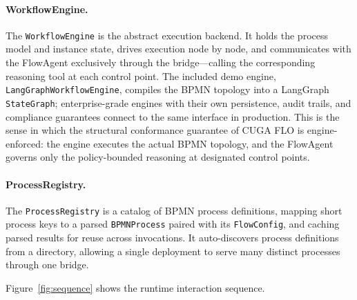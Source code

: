 \documentclass[11pt,a4paper]{article}
\begin{document}
\paragraph{WorkflowEngine.}
The \texttt{WorkflowEngine} is the abstract execution backend. It holds the process
model and instance state, drives execution node by node, and communicates with the
FlowAgent exclusively through the bridge---calling the corresponding reasoning tool
at each control point. The included demo engine, \texttt{LangGraphWorkflowEngine},
compiles the BPMN topology into a LangGraph \texttt{StateGraph}; enterprise-grade
engines with their own persistence, audit trails, and compliance guarantees connect
to the same interface in production. This is the sense in which the structural
conformance guarantee of CUGA FLO is engine-enforced: the engine executes the actual
BPMN topology, and the FlowAgent governs only the policy-bounded reasoning at
designated control points.

\paragraph{ProcessRegistry.}
The \texttt{ProcessRegistry} is a catalog of BPMN process definitions, mapping short
process keys to a parsed \texttt{BPMNProcess} paired with its \texttt{FlowConfig}, and
caching parsed results for reuse across invocations. It auto-discovers process
definitions from a directory, allowing a single deployment to serve many distinct
processes through one bridge.

Figure~\ref{fig:sequence} shows the runtime interaction sequence.
\end{document}
